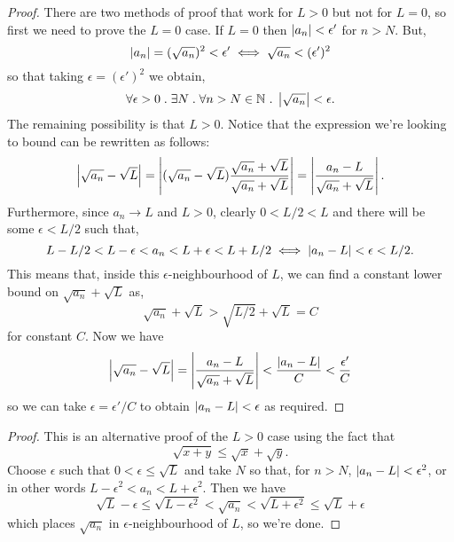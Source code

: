 \documentclass[../MathsNotesBase.tex]{subfiles}
\begin{document}
\begin{exe}
{\begin{proof}
					There are two methods of proof that work for ${ L > 0 }$ but not for ${ L = 0 }$, so first we need to prove the ${ L = 0 }$ case. If ${ L = 0 }$ then ${ \left\lvert a_n\right\rvert < \epsilon' }$ for ${ n > N }$. But,
					\[ \left\lvert a_n\right\rvert = (\sqrt{a_n})^2 < \epsilon' \iff \sqrt{a_n} < (\epsilon')^2 \]
					so that taking ${ \epsilon = (\epsilon')^2 }$ we obtain,
					\[ \forall \epsilon > 0 \;.\; \exists N \;.\; \forall n > N \in \mathbb{N}^{} \;.\; \left\lvert\sqrt{a_n}\right\rvert < \epsilon. \]
					The remaining possibility is that ${ L > 0 }$. Notice that the expression we're looking to bound can be rewritten as follows:
					\[ \left\lvert\sqrt{a_n} - \sqrt{L}\right\rvert = \left\lvert(\sqrt{a_n} - \sqrt{L})\frac{\sqrt{a_n} + \sqrt{L}}{\sqrt{a_n} + \sqrt{L}}\right\rvert = \left\lvert\frac{a_n - L}{\sqrt{a_n} + \sqrt{L}}\right\rvert. \]
					Furthermore, since ${ a_n \to L }$ and ${ L > 0 }$, clearly ${ 0 < L/2 < L }$ and there will be some ${ \epsilon < L/2 }$ such that,
					\[ L - L/2 < L - \epsilon < a_n < L + \epsilon < L + L/2 \iff \left\lvert a_n - L\right\rvert <\epsilon < L/2. \]
					This means that, inside this $\epsilon$-neighbourhood of $L$, we can find a constant lower bound on ${ \sqrt{a_n} + \sqrt{L} }$ as,
					\[ \sqrt{a_n} + \sqrt{L} > \sqrt{L/2} + \sqrt{L} = C \]
					for constant $C$. Now we have
					\[ \left\lvert\sqrt{a_n} - \sqrt{L}\right\rvert = \left\lvert\frac{a_n - L}{\sqrt{a_n} + \sqrt{L}}\right\rvert < \frac{\left\lvert a_n - L\right\rvert}{C} < \frac{\epsilon'}{C} \]
					so we can take ${ \epsilon = \epsilon'/C }$ to obtain ${ \left\lvert a_n - L\right\rvert < \epsilon }$ as required.
				\end{proof}
				\begin{proof}
					This is an alternative proof of the ${ L > 0 }$ case using the fact that
					\[ \sqrt{x + y} \leq \sqrt{x} + \sqrt{y}. \]
					Choose $\epsilon$ such that ${ 0 < \epsilon \leq \sqrt{L} }$ and take $N$ so that, for ${ n > N }$, ${ \left\lvert a_n - L\right\rvert < \epsilon^2 }$, or in other words ${ L - \epsilon^2 < a_n < L + \epsilon^2 }$. Then we have
					\[ \sqrt{L} - \epsilon \leq \sqrt{L - \epsilon^2} < \sqrt{a_n} < \sqrt{L + \epsilon^2} \leq \sqrt{L} + \epsilon \]
					which places $\sqrt{a_n}$ in $\epsilon$-neighbourhood of $L$, so we're done.
				\end{proof}
			}
			\bigskip
\end{exe}
\end{document}
